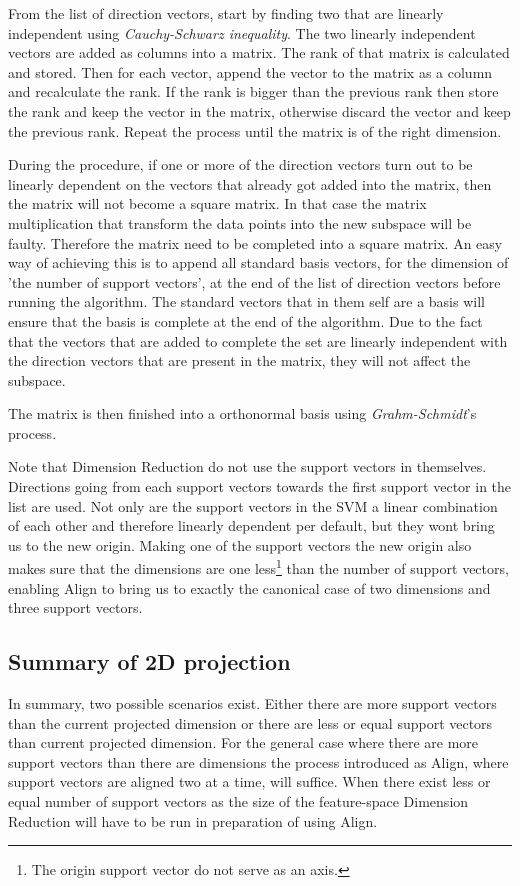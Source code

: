 \documentclass[a4paper,twoside]{bth}
\begin{document}
\par From the list of direction vectors, start by finding two that are linearly independent using \textit{Cauchy-Schwarz inequality}. The two linearly independent vectors are added as columns into a matrix. The rank of that matrix is calculated and stored. Then for each vector, append the vector to the matrix as a column and recalculate the rank. If the rank is bigger than the previous rank then store the rank and keep the vector in the matrix, otherwise discard the vector and keep the previous rank. Repeat the process until the matrix is of the right dimension.

\par During the procedure, if one or more of the direction vectors turn out to be linearly dependent on the vectors that already got added into the matrix, then the matrix will not become a square matrix. In that case the matrix multiplication that transform the data points into the new subspace will be faulty. Therefore the matrix need to be completed into a square matrix. An easy way of achieving this is to append all standard basis vectors, for the dimension of 'the number of support vectors', at the end of the list of direction vectors before running the algorithm. The standard vectors that in them self are a basis will ensure that the basis is complete at the end of the algorithm. Due to the fact that the vectors that are added to complete the set are linearly independent with the direction vectors that are present in the matrix, they will not affect the subspace.

\par The matrix is then finished into a orthonormal basis using \textit{Grahm-Schmidt}'s process.

\par Note that Dimension Reduction do not use the support vectors in themselves. Directions going from each support vectors towards the first support vector in the list are used. Not only are the support vectors in the SVM a linear combination of each other and therefore linearly dependent per default, but they wont bring us to the new origin. Making one of the support vectors the new origin also makes sure that the dimensions are one less\footnote{The origin support vector do not serve as an axis.} than the number of support vectors, enabling Align to bring us to exactly the canonical case of two dimensions and three support vectors. 



\subsection{Summary of 2D projection} In summary, two possible scenarios exist. Either there are more support vectors than the current projected dimension or there are less or equal support vectors than current projected dimension. For the general case where there are more support vectors than there are dimensions \cite{unpublished} the process introduced as Align, where support vectors are aligned two at a time, will suffice. When there exist less or equal number of support vectors as the size of the feature-space Dimension Reduction will have to be run in preparation of using Align. 
\end{document}
